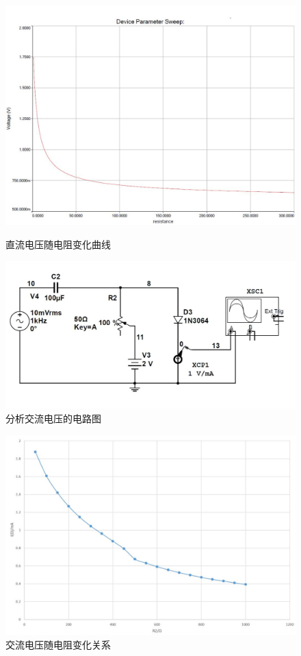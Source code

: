 \documentclass[UTF8,a4paper]{ctexart}
\begin{document}
\begin{figure}
\centering
\includegraphics[width=\textwidth]{cap/3.JPG}
\caption{直流电压随电阻变化曲线}
\label{DCP}
\includegraphics [width=\textwidth]{cap/11.JPG}
\caption{分析交流电压的电路图}
\label{ACA}
\end{figure}
\begin{figure}
\centering
\includegraphics[width=\textwidth]{cap/21.JPG}
\caption{交流电压随电阻变化关系}
\label{ACP}
\end{figure}
\end{document}
